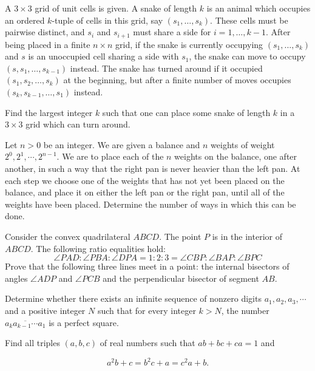 \documentclass[11pt]{scrartcl}
\begin{document}
\begin{problem}[965885167255885]
A $3 \times 3$ grid of unit cells is given. A snake of length $k$ is an animal which occupies an ordered $k$-tuple of cells in this grid, say $(s_1, \dots, s_k)$. These cells must be pairwise distinct, and $s_i$ and $s_{i+1}$ must share a side for $i = 1, \dots, k-1$. After being placed in a finite $n \times n$ grid, if the snake is currently occupying $(s_1, \dots, s_k)$ and $s$ is an unoccupied cell sharing a side with $s_1$, the snake can move to occupy $(s, s_1, \dots, s_{k-1})$ instead. The snake has turned around if it occupied $(s_1, s_2, \dots, s_k)$ at the beginning, but after a finite number of moves occupies $(s_k, s_{k-1}, \dots, s_1)$ instead.

Find the largest integer $k$ such that one can place some snake of length $k$ in a $3 \times 3$ grid which can turn around.
\end{problem}
\begin{problem}[742686070320805]
Let $n > 0$ be an integer. We are given a balance and $n$ weights of weight $2^0, 2^1, \cdots, 2^{n-1}$. We are to place each of the $n$ weights on the balance, one after another, in such a way that the right pan is never heavier than the left pan. At each step we choose one of the weights that has not yet been placed on the balance, and place it on either the left pan or the right pan, until all of the weights have been placed.
Determine the number of ways in which this can be done.
\end{problem}
\begin{problem}[915478364939250]
Consider the convex quadrilateral $ABCD$. The point $P$ is in the interior of $ABCD$. The following ratio equalities hold:
\[\angle PAD:\angle PBA:\angle DPA=1:2:3=\angle CBP:\angle BAP:\angle BPC\]Prove that the following three lines meet in a point: the internal bisectors of angles $\angle ADP$ and $\angle PCB$ and the perpendicular bisector of segment $AB$.
\end{problem}
\begin{problem}[227872694827710]
Determine whether there exists an infinite sequence of nonzero digits $a_1 , a_2 , a_3 , \cdots $ and a positive integer $N$ such that for every integer $k > N$, the number $\overline{a_k a_{k-1}\cdots a_1 }$ is a perfect square.
\end{problem}
\begin{problem}[260347681948452]
Find all triples $(a, b, c)$ of real numbers such that $ab + bc + ca = 1$ and

$$a^2b + c = b^2c + a = c^2a + b.$$
\end{problem}
\end{document}
